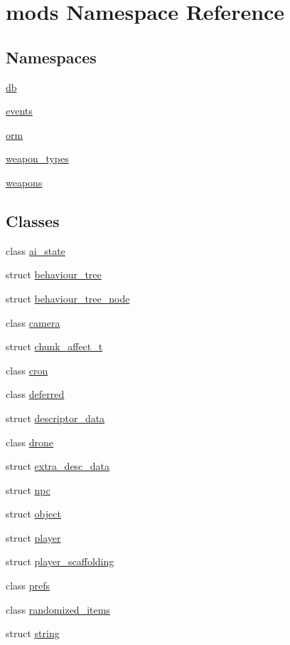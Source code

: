 \hypertarget{namespacemods}{}\section{mods Namespace Reference}
\label{namespacemods}
\subsection*{Namespaces}
\begin{DoxyCompactItemize}
\item 
 \hyperlink{namespacemods_1_1db}{db}
\item 
 \hyperlink{namespacemods_1_1events}{events}
\item 
 \hyperlink{namespacemods_1_1orm}{orm}
\item 
 \hyperlink{namespacemods_1_1weapon__types}{weapon\+\_\+types}
\item 
 \hyperlink{namespacemods_1_1weapons}{weapons}
\end{DoxyCompactItemize}
\subsection*{Classes}
\begin{DoxyCompactItemize}
\item 
class \hyperlink{classmods_1_1ai__state}{ai\+\_\+state}
\item 
struct \hyperlink{structmods_1_1behaviour__tree}{behaviour\+\_\+tree}
\item 
struct \hyperlink{structmods_1_1behaviour__tree__node}{behaviour\+\_\+tree\+\_\+node}
\item 
class \hyperlink{classmods_1_1camera}{camera}
\item 
struct \hyperlink{structmods_1_1chunk__affect__t}{chunk\+\_\+affect\+\_\+t}
\item 
class \hyperlink{classmods_1_1cron}{cron}
\item 
class \hyperlink{classmods_1_1deferred}{deferred}
\item 
struct \hyperlink{structmods_1_1descriptor__data}{descriptor\+\_\+data}
\item 
class \hyperlink{classmods_1_1drone}{drone}
\item 
struct \hyperlink{structmods_1_1extra__desc__data}{extra\+\_\+desc\+\_\+data}
\item 
struct \hyperlink{structmods_1_1npc}{npc}
\item 
struct \hyperlink{structmods_1_1object}{object}
\item 
struct \hyperlink{classmods_1_1player}{player}
\item 
struct \hyperlink{structmods_1_1player__scaffolding}{player\+\_\+scaffolding}
\item 
class \hyperlink{classmods_1_1prefs}{prefs}
\item 
class \hyperlink{classmods_1_1randomized__items}{randomized\+\_\+items}
\item 
struct \hyperlink{structmods_1_1string}{string}
\end{DoxyCompactItemize}
